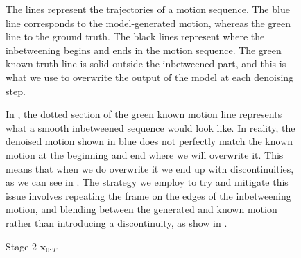 \begin{figure}
    \centering
    \hfil
    \hfil
    \caption{Stage 2 $\mathbf{x}_{0:T}$}
    \label{fig:diffusion_inbetweening_blending}
    \medskip
    \small
    \raggedright
    The lines represent the trajectories of a motion sequence. The blue line corresponds to the model-generated motion, whereas the green line to the ground truth. The black lines represent where the inbetweening begins and ends in the motion sequence. The green known truth line is solid outside the inbetweened part, and this is what we use to overwrite the output of the model at each denoising step.
    
    In \protect{}, the dotted section of the green known motion line represents what a smooth inbetweened sequence would look like. In reality, the denoised motion shown in blue does not perfectly match the known motion at the beginning and end where we will overwrite it. This means that when we do overwrite it we end up with discontinuities, as we can see in \protect{}. The strategy we employ to try and mitigate this issue involves repeating the frame on the edges of the inbetweening motion, and blending between the generated and known motion rather than introducing a discontinuity, as show in \protect{}.
    
\end{figure}
